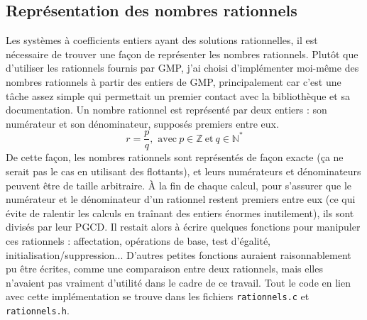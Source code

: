 \documentclass[french]{article}
\begin{document}
\subsection{Représentation des nombres rationnels}
Les systèmes à coefficients entiers ayant des solutions rationnelles, il est nécessaire de trouver une façon de représenter les nombres rationnels. Plutôt que d'utiliser les rationnels fournis par GMP, j'ai choisi d'implémenter moi-même des nombres rationnels à partir des entiers de GMP, principalement car c'est une tâche assez simple qui permettait un premier contact avec la bibliothèque et sa documentation.
Un nombre rationnel est représenté par deux entiers : son numérateur et son dénominateur, supposés premiers entre eux. 
$$r = \frac{p}{q}, \mbox{ avec} \ p \in \mathbb{Z}\ \mbox{et} \ q \in \mathbb{N}^*$$
De cette façon, les nombres rationnels sont représentés de façon exacte (ça ne serait pas le cas en utilisant des flottants), et leurs numérateurs et dénominateurs peuvent être de taille arbitraire.
À la fin de chaque calcul, pour s'assurer que le numérateur et le dénominateur d'un rationnel restent premiers entre eux (ce qui évite de ralentir les calculs en traînant des entiers énormes inutilement), ils sont divisés par leur PGCD.
Il restait alors à écrire quelques fonctions pour manipuler ces rationnels : affectation, opérations de base, test d'égalité, initialisation/suppression... D'autres petites fonctions auraient raisonnablement pu être écrites, comme une comparaison entre deux rationnels, mais elles n'avaient pas vraiment d'utilité dans le cadre de ce travail.
Tout le code en lien avec cette implémentation se trouve dans les fichiers {\tt rationnels.c} et {\tt rationnels.h}.
\end{document}

